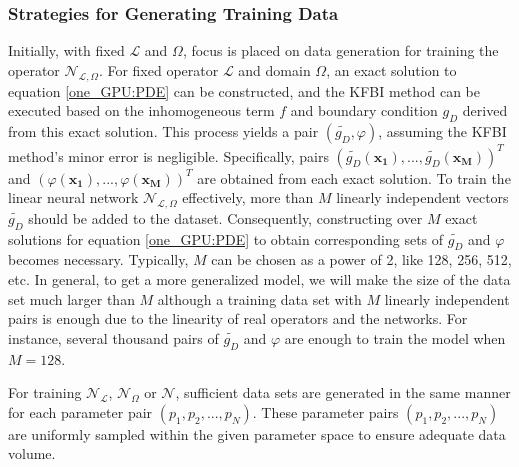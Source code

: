 \documentclass{article}
\begin{document}
\subsubsection{Strategies for Generating Training Data} \label{Strategies for Generating Training Data}
Initially, with fixed $\mathcal{L}$ and $\Omega$, focus is placed on data generation for training the operator $\mathcal{N}_{\mathcal{L}, \Omega}$. For fixed operator $\mathcal{L}$ and domain $\Omega$, an exact solution to equation \eqref{one_GPU:PDE} can be constructed, and the KFBI method can be executed based on the inhomogeneous term $f$ and boundary condition $g_D$ derived from this exact solution. This process yields a pair $(\widetilde{g_D}, \varphi)$, assuming the KFBI method's minor error is negligible. Specifically, pairs $(\widetilde{g_D}(\mathbf{x_1}), ..., \widetilde{g_D}(\mathbf{x_M}))^T$ and $(\varphi(\mathbf{x_1}), ..., \varphi(\mathbf{x_M}))^T$ are obtained from each exact solution. To train the linear neural network $\mathcal{N}_{\mathcal{L}, \Omega}$ effectively, more than $M$ linearly independent vectors $\widetilde{g_D}$ should be added to the dataset. Consequently, constructing over $M$ exact solutions for equation \eqref{one_GPU:PDE} to obtain corresponding sets of $\widetilde{g_D}$ and $\varphi$ becomes necessary. Typically, $M$ can be chosen as a power of 2, like 128, 256, 512, etc. In general, to get a more generalized model, we will make the size of the data set much larger than $M$ although a training data set with $M$ linearly independent pairs is enough due to the linearity of real operators and the networks. For instance, several thousand pairs of $\widetilde{g_D}$ and $\varphi$ are enough to train the model when $M = 128$.

For training $\mathcal{N}_{\mathcal{L}}$, $\mathcal{N}_{\Omega}$ or $\mathcal{N}$, sufficient data sets are generated in the same manner for each parameter pair \((p_1, p_2, ..., p_N)\). These parameter pairs \((p_1, p_2, ..., p_N)\) are uniformly sampled within the given parameter space to ensure adequate data volume.
 
\end{document}
